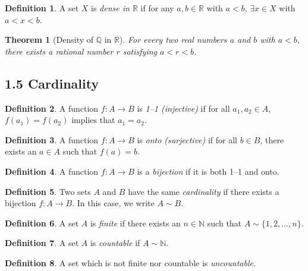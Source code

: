 \documentclass{amsart}
\newtheorem*{theorem}{Theorem}
\theoremstyle{definition}
\newtheorem*{definition}{Definition}
\newcommand{\N}{\mathbb{N}}
\newcommand{\Q}{\mathbb{Q}}
\newcommand{\R}{\mathbb{R}}
\begin{document}
\begin{definition}
  A set $X$ is \emph{dense in $\R$} if for any $a, b \in \R$ with $a < b$,
  $\exists x \in X$ with $a < x < b$.
\end{definition}

\begin{theorem}[Density of $\Q$ in $\R$]
  For every two real numbers $a$ and $b$ with $a < b$, there exists a rational
  number $r$ satisfying $a < r < b$.
\end{theorem}

\subsection*{1.5 Cardinality}

\begin{definition}
  A function $f : A \rightarrow B$ is \emph{1--1 (injective)} if for all $a_1,
  a_2 \in A$, $f(a_1) = f(a_2)$ implies that $a_1 = a_2$.
\end{definition}

\begin{definition}
  A function $f : A \rightarrow B$ is \emph{onto (surjective)} if for all $b
  \in B$, there exists an $a \in A$ such that $f(a) = b$.
\end{definition}

\begin{definition}
  A function $f : A \rightarrow B$ is a \emph{bijection} if it is both 1--1 and
  onto.
\end{definition}

\begin{definition}
  Two sets $A$ and $B$ have the same \emph{cardinality} if there exists a
  bijection $f : A \rightarrow B$. In this case, we write $A \sim B$.
\end{definition}

\begin{definition}
  A set $A$ is \emph{finite} if there exists an $n \in \N$ such that $A \sim
  \{1, 2, \ldots, n\}$.
\end{definition}

\begin{definition}
  A set $A$ is \emph{countable} if $A \sim \N$.
\end{definition}

\begin{definition}
  A set which is not finite nor countable is \emph{uncountable}.
\end{definition}
\end{document}
